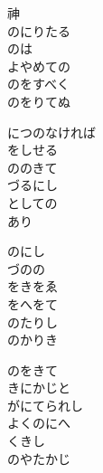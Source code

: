 \documentclass[10pt,b5j]{tarticle} %
\begin{document}
\vspace{1.5em} %
\newcommand{\linespace}{0.5em} %
\newcommand{\blocksize}{0.5\hsize} %
\begin{enumerate} %
    \begin{minipage}[c]{\blocksize}
    
        \vspace{\linespace}
        \item
        神\\
        のにりたる\\
        のは\\
        よやめての\\
        のをすべく\\
        のをりてぬ
        
        \vspace{\linespace}
        \item
        につのなければ\\
        をしせる\\
        ののきて\\
        づるにし\\
        としての\\
        あり
        
        \vspace{\linespace}
        \item
        のにし\\
        づのの\\
        をきをゑ\\
        をへをて\\
        のたりし\\
        のかりき
        
        \vspace{\linespace}
        \item
        のをきて\\
        きにかじと\\
        がにてられし\\
        よくのにへ\\
        くきし\\
        のやたかじ
        

\end{minipage}
\end{enumerate}
\end{document}
